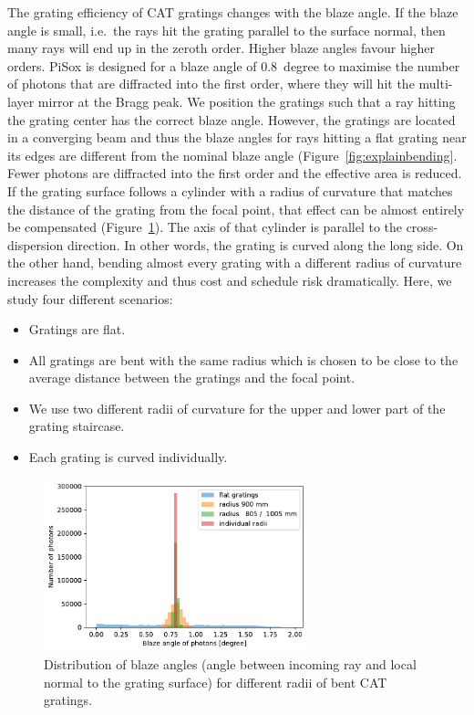 \documentclass[]{spie}  %
\begin{document}
The grating efficiency of CAT gratings changes with the blaze
angle. If the blaze angle is small, i.e.\ the rays hit the grating
parallel to the surface normal, then many rays will end up in the
zeroth order. Higher blaze angles favour higher orders. PiSox is
designed for a blaze angle of 0.8~degree to maximise the number of
photons that are diffracted into the first order, where they will hit
the multi-layer mirror at the Bragg peak. We position the gratings
such that a ray hitting the grating center has the correct blaze
angle. However, the gratings are located in a converging beam and thus the blaze
angles for rays hitting a flat grating near its edges are different from
the nominal blaze angle (Figure~\ref{fig:explainbending}. Fewer photons are diffracted into the first
order and the effective area is reduced.
If the grating surface
follows a cylinder with a radius of curvature that matches the
distance of the grating from the focal point, that effect can be
almost entirely be compensated (Figure~\ref{fig:curvature}). The axis
of that cylinder is parallel to the cross-dispersion direction. In
other words, the grating is curved along the long side. On the other
hand, bending almost every grating with a different radius of
curvature increases the complexity and thus cost and schedule risk
dramatically. Here, we study four different scenarios:
\begin{itemize}
    \item Gratings are flat.
    \item All gratings are bent with the same radius which is chosen to be close to the average distance between the gratings and the focal point.
    \item We use two different radii of curvature for the upper and lower part of the grating staircase.
    \item Each grating is curved individually.
\end{itemize}

   \begin{figure} [ht]
   \begin{center}
   \includegraphics[height=5cm]{curvature.pdf}
   \end{center}
   \caption
   { \label{fig:curvature}Distribution of blaze angles (angle between incoming ray and local normal to the grating surface) for different radii of bent CAT gratings.
}
   \end{figure}
\end{document}
